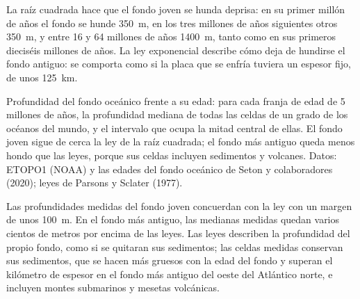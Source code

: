 La raíz cuadrada hace que el fondo joven se hunda deprisa: en su primer millón
de años el fondo se hunde \qty{350}{m}, en los tres millones de años
siguientes otros \qty{350}{m}, y entre 16 y 64 millones de años \qty{1400}{m},
tanto como en sus primeros dieciséis millones de años. La ley exponencial
describe cómo deja de hundirse el fondo antiguo: se comporta como si la placa
que se enfría tuviera un espesor fijo, de unos \qty{125}{km}.

\begin{omfigure}

{\small Profundidad del fondo oceánico frente a su edad: para cada franja de
edad de 5 millones de años, la profundidad mediana de todas las celdas de un
grado de los océanos del mundo, y el intervalo que ocupa la mitad central de
ellas. El fondo joven sigue de cerca la ley de la raíz cuadrada; el fondo más
antiguo queda menos hondo que las leyes, porque sus celdas incluyen
sedimentos y volcanes. Datos: ETOPO1 (NOAA) y las edades del fondo oceánico
de Seton y colaboradores (2020); leyes de Parsons y Sclater (1977).}
\end{omfigure}

Las profundidades medidas del fondo joven concuerdan con la ley con un margen
de unos \qty{100}{m}. En el fondo más antiguo, las medianas medidas quedan
varios cientos de metros por encima de las leyes. Las leyes describen la
profundidad del propio fondo, como si se quitaran sus sedimentos; las celdas
medidas conservan sus sedimentos, que se hacen más gruesos con la edad del
fondo y superan el kilómetro de espesor en el fondo más antiguo del oeste del
Atlántico norte, e incluyen montes submarinos y mesetas volcánicas.

